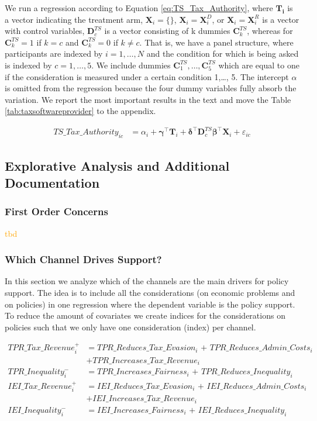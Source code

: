 \documentclass[11pt]{article}
\newcommand{\tk}[1]{\textcolor{orange}{#1}}
\begin{document}
We run a regression according to Equation \ref{eq:TS_Tax_Authority}, where $\mathbf{T_i}$ is a vector indicating the treatment arm, $\mathbf{X}_{i} = \{\}$, $\mathbf{X}_{i} = \mathbf{X}_{i}^{D}$, or  $\mathbf{X}_{i} = \mathbf{X}_{i}^{R}$ is a vector with control variables, $\mathbf{D}_c^{TS}$ is a vector consisting of k dummies $\mathbf{C}_k^{TS}$, whereas for $\mathbf{C}_k^{TS}=1$ if $k=c$ and $\mathbf{C}_k^{TS}=0$ if $k \neq c$. That is, we have a panel structure, where participants are indexed by $i=1,\ldots,N$ and the condition for which is being asked is indexed by $c=1,\ldots,5$. We include dummies $\mathbf{C}_1^{TS},\ldots, \mathbf{C}_5^{TS}$ which are equal to one if the consideration is measured under a certain condition 1,\ldots, 5. The intercept $\alpha$ is omitted from the regression because the four dummy variables fully absorb the variation. We report the most important results in the text and move the Table \ref{tab:taxsoftwareprovider} to the appendix.

\begin{align}
    \label{eq:TS_Tax_Authority}
    \text{$TS\_Tax\_Authority_{ic}$}
    &= \alpha_i + \boldsymbol{\gamma}^{\top}\mathbf{T}_i + \boldsymbol{\delta}^{\top}\mathbf{D}_c^{TS} \boldsymbol{\beta}^{\top}\mathbf{X}_{i} + \varepsilon_{ic} 
\end{align}

\FloatBarrier
\subsection{Explorative Analysis and Additional Documentation}
\subsubsection{First Order Concerns}
\tk{tbd}
\subsubsection{Which Channel Drives Support?}
In this section we analyze which of the channels are the main drivers for policy support. The idea is to include all the considerations (on economic problems and on policies) in one regression where the dependent variable is the policy support. To reduce the amount of covariates we create indices for the considerations on policies such that we only have one consideration (index) per channel. 

\begin{align}
    \text{$TPR\_Tax\_Revenue_i^+$} &=  \text{$TPR\_Reduces\_Tax\_Evasion_i$ + $TPR\_Reduces\_Admin\_Costs_i$}  \\ & +\text{$TPR\_Increases\_Tax\_Revenue_i$} \\
    \text{$TPR\_Inequality_i^-$} &=  \text{$TPR\_Increases\_Fairness_i$ + $TPR\_Reduces\_Inequality_i$} \\
    \text{$IEI\_Tax\_Revenue_i^+$} &=  \text{$IEI\_Reduces\_Tax\_Evasion_i$ + $IEI\_Reduces\_Admin\_Costs_i$} \\ & +\text{$IEI\_Increases\_Tax\_Revenue_i$} \\
    \text{$IEI\_Inequality_i^-$} &=  \text{$IEI\_Increases\_Fairness_i$ + $IEI\_Reduces\_Inequality_i$}
\end{align}
\end{document}
